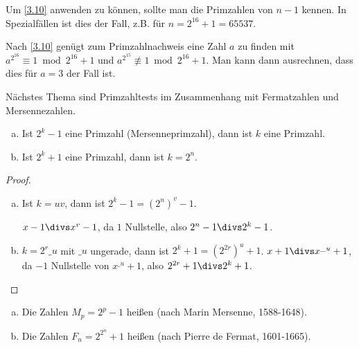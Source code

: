 \begin{nt} \label{3.11}
	Um \ref{3.10} anwenden zu können, sollte man die Primzahlen von $n-1$ kennen.
	In Spezialfällen ist dies der Fall, z.B. für $n = 2^{16} + 1 = 65537$.

	Nach \ref{3.10} genügt zum Primzahlnachweis eine Zahl $a$ zu finden mit $a^{2^{16}} \equiv 1 \bmod 2^{16} + 1$ und $a^{2^{15}} \not\equiv 1 \bmod 2^{16} + 1$.
	Man kann dann ausrechnen, dass dies für $a = 3$ der Fall ist.
\end{nt}

Nächstes Thema sind Primzahltests im Zusammenhang mit Fermatzahlen und Mersennezahlen.

\begin{lem} \label{3.12}
	\begin{enumerate}[a)]
		\item
			Ist $2^k - 1$ eine Primzahl (Mersenneprimzahl), dann ist $k$ eine Primzahl.
		\item
			Ist $2^k + 1$ eine Primzahl, dann ist $k = 2^n$.
	\end{enumerate}
	\begin{proof}
		\begin{enumerate}[a)]
			\item
				Ist $k = uv$, dann ist $2^k - 1 = (2^n)^v - 1$.

				$x-1 \divs x^v - 1$, da $1$ Nullstelle, also $2^n -1 \divs 2^k - 1$.
			\item
				$k = 2^r \_ u$ mit $\_ u$ ungerade, dann ist $2^k + 1 = (2^{2r})^u + 1$.
				$x + 1 \divs x^{\_ u} + 1$, da $-1$ Nullstelle von $x^{\_ u} + 1$, also $2^{2r} + 1 \divs 2^k + 1$.
		\end{enumerate}
	\end{proof}
\end{lem}

\begin{df} \label{3.13}
	\begin{enumerate}[a)]
		\item
			Die Zahlen $M_p = 2^p - 1$ heißen  (nach Marin Mersenne, 1588-1648).
		\item
			Die Zahlen $F_n = 2^{2^n} + 1$ heißen  (nach Pierre de Fermat, 1601-1665).
	\end{enumerate}
\end{df}

